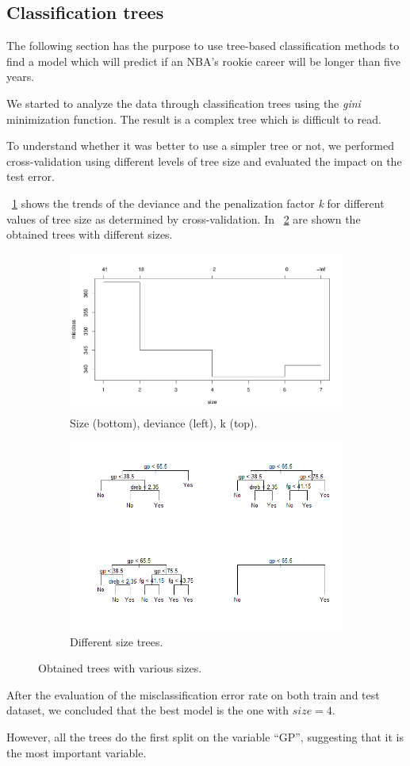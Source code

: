 \subsection{Classification trees}

The following section has the purpose to use tree-based classification methods to find a model which will predict if an NBA's rookie career will be longer than five years.

We started to analyze the data through classification trees using the \textit{gini} minimization function. The result is a complex tree which is difficult to read.

To understand whether it was better to use a simpler tree or not, we performed cross-validation using different levels of tree size and evaluated the impact on the test error.

\Fig~\ref{fig:tree_cv_plot} shows the trends of the deviance and the penalization factor \textit{k} for different values of tree size as determined by cross-validation. In \Fig~\ref{fig:tree_prune_comparison} are shown the obtained trees with different sizes.

\begin{figure}[h]
	\centering
	\begin{subfigure}{.6\textwidth}
		\centering
		\includegraphics[width=0.5\linewidth]{ImageFiles/Classification/Trees/tree_cv_plot}
		\caption{Size (bottom), deviance (left), k (top).}
		\label{fig:tree_cv_plot}
	\end{subfigure}%
	\begin{subfigure}{.6\textwidth}
		\centering
		\includegraphics[width=0.6\linewidth]{ImageFiles/Classification/Trees/tree_prune_comparison}
		\caption{Different size trees.}
		\label{fig:tree_prune_comparison}
	\end{subfigure}
	\caption{Obtained trees with various sizes.}
	\label{fig:treeSize}
\end{figure}

After the evaluation of the misclassification error rate on both train and test dataset, we concluded that the best model is the one with $size = 4$.

However, all the trees do the first split on the variable ``GP'', suggesting that it is the most important variable.

